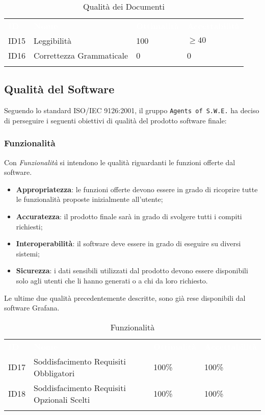 \begin{longtable}{|C{.15\textwidth}|C{.24\textwidth}|C{.24\textwidth}|C{.24\textwidth}|}
\hline
{}\textbf{\textcolor{white}{ID}} & \textbf{\textcolor{white}{Nome}} & \textbf{\textcolor{white}{Ottimalità}} & \textbf{\textcolor{white}{Accettabilità}}\\
ID15 & Leggibilità & 100 & $\geq 40$ \\
\hline
{}ID16 & Correttezza Grammaticale & 0 & 0 \\ 
\hline
\caption{Qualità dei Documenti}
\label{QualitàDocumenti}
\end{longtable}

\subsection{Qualità del Software}

Seguendo lo standard ISO/IEC 9126:2001, il gruppo \texttt{Agents of S.W.E.} ha deciso di perseguire i seguenti obiettivi di qualità del prodotto software finale:

\subsubsection{Funzionalità}

Con \textit{Funzionalità} si intendono le qualità riguardanti le funzioni offerte dal software.
\begin{itemize}
	\item \textbf{Appropriatezza}: le funzioni offerte devono essere in grado di ricoprire tutte le funzionalità proposte inizialmente all'utente;
	\item \textbf{Accuratezza}: il prodotto finale sarà in grado di svolgere tutti i compiti richiesti;
	\item \textbf{Interoperabilità}: il software deve essere in grado di eseguire su diversi sistemi;
	\item \textbf{Sicurezza}: i dati sensibili utilizzati dal prodotto devono essere disponibili solo agli utenti che li hanno generati o a chi da loro richiesto. 
\end{itemize}
Le ultime due qualità precedentemente descritte, sono già rese disponibili dal software Grafana. 

\begin{longtable}{|C{.15\textwidth}|C{.24\textwidth}|C{.24\textwidth}|C{.24\textwidth}|}
\hline
{}\textbf{\textcolor{white}{ID}} & \textbf{\textcolor{white}{Nome}} & \textbf{\textcolor{white}{Ottimalità}} & \textbf{\textcolor{white}{Accettabilità}}\\
ID17 & Soddisfacimento Requisiti Obbligatori & 100\% & 100\%\\
\hline
{}ID18 & Soddisfacimento Requisiti Opzionali Scelti & 100\% & 100\% \\ 
\hline
\caption{Funzionalità}
\label{Funzionalità}
\end{longtable}

